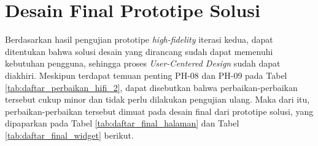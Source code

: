 \section{Desain Final Prototipe Solusi}
\label{sec:final}

Berdasarkan hasil pengujian prototipe \textit{high-fidelity} iterasi kedua, dapat ditentukan bahwa solusi desain yang dirancang sudah dapat memenuhi kebutuhan pengguna, sehingga proses \textit{User-Centered Design} sudah dapat diakhiri. Meskipun terdapat temuan penting PH-08 dan PH-09 pada Tabel \ref{tab:daftar_perbaikan_hifi_2}, dapat disebutkan bahwa perbaikan-perbaikan tersebut cukup minor dan tidak perlu dilakukan pengujian ulang. Maka dari itu, perbaikan-perbaikan tersebut dimuat pada desain final dari prototipe solusi, yang dipaparkan pada Tabel \ref{tab:daftar_final_halaman} dan Tabel \ref{tab:daftar_final_widget} berikut.

\newlength{\finalwidth}
\setlength{\finalwidth}{0.325\textwidth}

\newlength{\finaldescwidth}
\setlength{\finaldescwidth}{0.33\textwidth}

\newcommand{\finaldesc}[1]{\desc{\finaldescwidth}{#1}}

\newcommand{\final}[1]{\begin{center}\texttt{[image: \#1]}\end{center}}
\newcommand{\finalwidget}[2]{\begin{center}\texttt{[image: \#2]}\end{center}}

